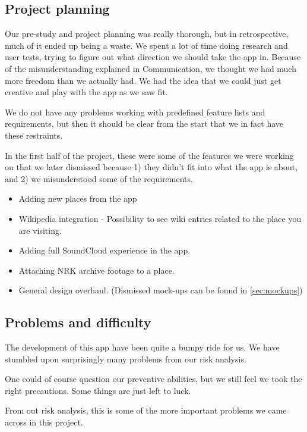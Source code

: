 	\subsection{Project planning}


Our pre-study and project planning was really thorough, but in retrospective, much of it ended up being a waste. We spent a lot of time doing research and user tests, trying to figure out what direction we should take the app in. Because of the misunderstanding explained in Communication, we thought we had much more freedom than we actually had. We had the idea that we could just get creative and play with the app as we saw fit.

We do not have any problems working with predefined feature lists and requirements, but then it should be clear from the start that we in fact have these restraints.

In the first half of the project, these were some of the features we were working on that we later dismissed because 1) they didn't fit into what the app is about, and 2) we misunderstood some of the requirements.

\begin{itemize}
	\item Adding new places from the app
	\item Wikipedia integration - Possibility to see wiki entries related to the place you are visiting.
	\item Adding full SoundCloud experience in the app.
	\item Attaching NRK archive footage to a place. 
	\item General design overhaul.  (Dismissed mock-ups can be found in \ref{sec:mockups})
\end{itemize}

	\subsection{Problems and difficulty}

The development of this app have been quite a bumpy ride for us. We have stumbled upon surprisingly many problems from our risk analysis.

One could of course question our preventive abilities, but we still feel we took the right precautions. Some things are just left to luck.

From out risk analysis, this is some of the more important problems we came across in this project. 

